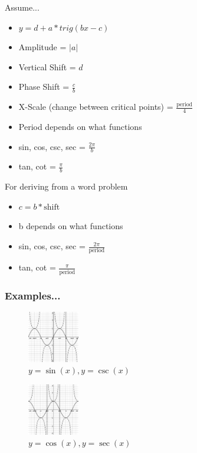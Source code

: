 \documentclass[twocolumn]{article}
\begin{document}
Assume...
\begin{itemize}[label=--]
	\setlength\itemsep{-0.55em}
	\item $ y = d + a * trig(bx - c) $
	\item Amplitude = $ \vert a \vert $
	\item Vertical Shift = $d$
	\item Phase Shift = $ \frac{c}{b} $
	\item X-Scale (change between critical points) = $ \frac{\text{period}}{4} $
	\item Period depends on what functions
	\item sin, cos, csc, sec = $ \frac{2\pi}{b} $
	\item tan, cot = $ \frac{\pi}{b} $
\end{itemize}
For deriving from a word problem
\begin{itemize}[label=--]
	\setlength\itemsep{-0.55em}
	\item $ c = b * \text{shift} $
	\item b depends on what functions
	\item sin, cos, csc, sec = $ \frac{2\pi}{\text{period}} $
	\item tan, cot = $ \frac{\pi}{\text{period}} $
\end{itemize}

\subsubsection*{Examples...}

\begin{figure}[H]
	\centering
	\includegraphics[width=0.20\textwidth]{sin-csc.png}
	\caption{$ y = \sin(x), y = \csc(x) $}
\end{figure}

\begin{figure}[H]
	\centering
	\includegraphics[width=0.20\textwidth]{cos-sec.png}
	\caption{$ y = \cos(x), y= \sec(x) $}
\end{figure}
\end{document}
